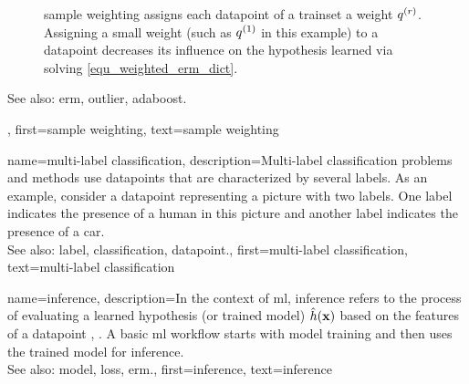 {{\begin{figure}[H]
\begin{center}
      		\caption{\Gls{sample} weighting assigns each \gls{datapoint} of a \gls{trainset} 
	  		a weight $q^{(r)}$. Assigning a small weight 
	  		(such as $q^{(1)}$ in this example) to a 
	  		\gls{datapoint} decreases its influence on the \gls{hypothesis} 
	 		learned via solving \eqref{equ_weighted_erm_dict}.}
      			\label{fig_sampleweighting_dict}
    			\end{center}
    		\end{figure}
		See also: \gls{erm}, \gls{outlier}, \gls{adaboost}.},
	first={sample weighting}, 
	text={sample weighting}
}

{name={multi-label classification}, 
	description={Multi-\gls{label} 
		\gls{classification} problems and methods use \glspl{datapoint} 
		that are characterized by several \glspl{label}. As an example, consider a \gls{datapoint} 
		representing a picture with two \glspl{label}. One \gls{label} indicates the presence of a human 
		in this picture and another \gls{label} indicates the presence of a car.
				\\
		See also: \gls{label}, \gls{classification}, \gls{datapoint}.},
	    first={multi-label classification},
	    text={multi-label classification} 
}

{name={inference}, 
	description={In the context of \gls{ml}, inference refers to the process 
		of evaluating a learned \gls{hypothesis} (or trained \gls{model}) $\hat{h}({\bf x})$ 
		based on the \glspl{feature} of a \gls{datapoint} \cite{BishopBook}, \cite{Murphy2012}. 
		A basic \gls{ml} workflow starts with \gls{model} \gls{training} and then 
		uses the trained \gls{model} for inference. 
				\\
		See also: \gls{model}, \gls{loss}, \gls{erm}.},
	first={inference},
	text={inference}
}

